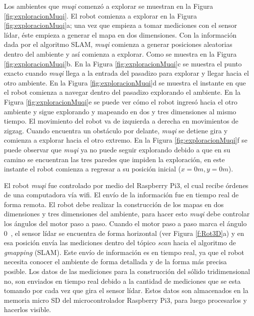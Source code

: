 
Los ambientes que \textit{muqi} comenzó a explorar se muestran en la Figura 
\ref{fig:exploracionMuqi}. El robot comienza a explorar en la Figura 
\ref{fig:exploracionMuqi}a; una vez que empieza a tomar mediciones con el sensor 
lídar, éste empieza a generar el mapa en dos dimensiones. Con la información
dada por el algoritmo SLAM, \textit{muqi} comienza a generar posiciones aleatorias 
dentro del ambiente y así comienza a explorar. Como se muestra en la Figura 
\ref{fig:exploracionMuqi}b. En la Figura \ref{fig:exploracionMuqi}c se muestra el 
punto exacto cuando \textit{muqi} llega a la entrada del pasadizo para explorar y 
llegar hacia el otro ambiente. En la Figura \ref{fig:exploracionMuqi}d se 
muestra el instante en que el robot comienza a navegar dentro del pasadizo explorando 
el ambiente. En la Figura \ref{fig:exploracionMuqi}e se puede ver cómo el robot ingresó 
hacia el otro ambiente y sigue explorando y mapeando en dos y tres dimensiones al 
mismo tiempo. El movimiento del robot va de izquierda a derecha en movimientos de 
zigzag. Cuando encuentra un obstáculo por delante, \textit{muqi} se detiene gira y 
comienza a explorar hacia el otro extremo. En la Figura \ref{fig:exploracionMuqi}f 
se puede observar que \textit{muqi} ya no puede seguir explorando debido a que en 
su camino se encuentran las tres paredes que impiden la exploración, en este 
instante el robot comienza a regresar a su posición inicial ($x = 0 m, y = 0 m$).

El robot \textit{muqi} fue controlado por medio del Raspberry Pi3, el 
cual recibe órdenes de una computadora vía wifi. El envío de la información fue 
en tiempo real de forma remota. El robot debe realizar la construcción de los 
mapas en dos dimensiones y tres dimensiones del ambiente, para hacer esto 
\textit{muqi} debe controlar los ángulos del motor paso a paso. Cuando el motor 
paso a paso marca el ángulo 0~\grad, el sensor lídar se encuentra de forma 
horizontal (ver Figura \ref{f:Rot3D}a) y en esa posición envía las mediciones 
dentro del tópico \textit{scan} hacia el algoritmo de \textit{gmapping} 
(SLAM). Este envío de información es en tiempo real, ya que el robot necesita 
conocer el ambiente de forma detallada y de la forma más precisa posible. Los 
datos de las mediciones para la construcción del sólido tridimensional no, son
enviados en tiempo real debido a la cantidad de mediciones que se esta tomando 
por cada vez que gira el sensor lídar. Estos datos son almacenados en la memoria 
micro SD del microcontrolador Raspberry Pi3, para luego procesarlos y hacerlos 
visible.

